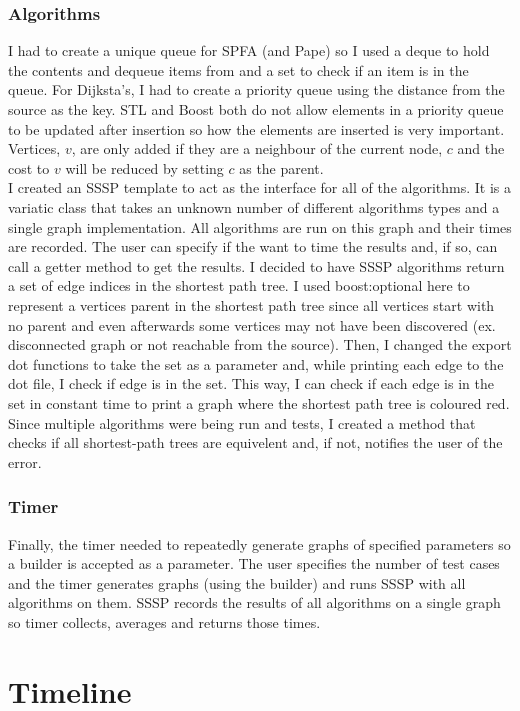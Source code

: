 \documentclass{article}
\begin{document}
\subsubsection{Algorithms}
I had to create a unique queue for SPFA (and Pape) so I used a deque to hold the contents and dequeue items from and a set to check if an item is in the queue. For Dijksta's, I had to create a priority queue using the distance from the source as the key. STL and Boost both do not allow elements in a priority queue to be updated after insertion so how the elements are inserted is very important. Vertices, $v$, are only added if they are a neighbour of the current node, $c$ and the cost to $v$ will be reduced by setting $c$ as the parent. \\
I created an SSSP template to act as the interface for all of the algorithms. It is a variatic class that takes an unknown number of different algorithms types and a single graph implementation. All algorithms are run on this graph and their times are recorded. The user can specify if the want to time the results and, if so, can call a getter method to get the results. I decided to have SSSP algorithms return a set of edge indices in the shortest path tree.  I used boost:optional here to represent a vertices parent in the shortest path tree since all vertices start with no parent and even afterwards some vertices may not have been discovered (ex. disconnected graph or not reachable from the source). Then, I changed the export dot functions to take the set as a parameter and, while printing each edge to the dot file, I check if edge is in the set. This way, I can check if each edge is in the set in constant time to print a graph where the shortest path tree is coloured red. Since multiple algorithms were being run and tests, I created a method that checks if all shortest-path trees are equivelent and, if not, notifies the user of the error.
 
 
\subsubsection{Timer}
Finally, the timer needed to repeatedly generate graphs of specified parameters so a builder is accepted as a parameter. The user specifies the number of test cases and the timer generates graphs (using the builder) and runs SSSP with all algorithms on them. SSSP records the results of all algorithms on a single graph so timer collects, averages and returns those times.

\section{Timeline}
\end{document}
